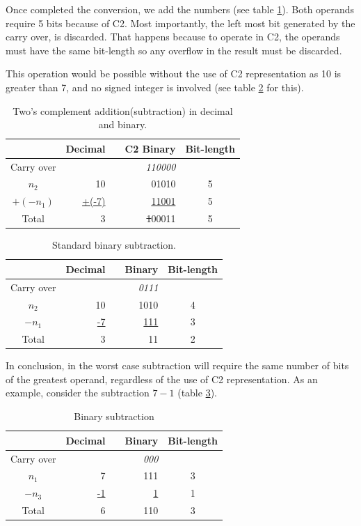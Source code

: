 \documentclass[12pt]{article}
\begin{document}
Once completed the conversion, we add the numbers (see table  \ref{tab:03}).
Both operands require 5 bits because of C2. Most importantly, the left most
bit generated by the carry over, is discarded. That happens because to operate
in C2, the operands must have the same bit-length so any overflow in the result
must be discarded.

This operation would be possible without the use of C2 representation as 10 is
greater than 7, and no signed integer is involved (see table \ref{tab:04} for
this).

\begin{table}[ht]
	\centering
    \caption{Two's complement addition(subtraction) in decimal and binary.}
    \begin{tabular}{crrrc}
    \hline
    	  & Decimal & & C2 Binary & Bit-length \\
    \hline      
    Carry over & 	& & \textit{110000} & \\
    $n_2$ & 10	& & 01010 & 5 \\
    $+(-n_1)$ & \underline{+(-7)} & & \underline{11001} & 5 \\
    Total & 3	& & \sout{1}00011 & 5 \\
    \hline
	\end{tabular}
    \label{tab:03}
\end{table}

\begin{table}[ht]
    \centering
    \caption{Standard binary subtraction.}
    \begin{tabular}{crrrc}
    \hline
    	  & Decimal & & Binary & Bit-length \\
    \hline      
    Carry over& 	& & \textit{0111} & \\
    $n_2$ & 10	& & 1010 & 4 \\
    $-n_1$ & \underline{-7} & & \underline{111} & 3 \\
    Total & 3	& & 11 & 2\\
    \hline
	\end{tabular}
    \label{tab:04}
\end{table}

In conclusion, in the worst case subtraction will require the same number of
bits of the greatest operand, regardless of the use of C2 representation. As an
example, consider the subtraction $7-1$ (table \ref{tab:05}).

\begin{table}[ht]
  \centering
  \caption{Binary subtraction}
  \begin{tabular}{crrrc}
    \hline
	  & Decimal & & Binary & Bit-length \\
    \hline      
    Carry over & 	& & \textit{000} & \\
    $n_1$ & 7	& & 111 & 3 \\
    $-n_3$ & \underline{-1} & & \underline{1} & 1 \\
    Total & 6	& & 110 & 3\\
    \hline
  \end{tabular}
  \label{tab:05}
\end{table}
\end{document}
